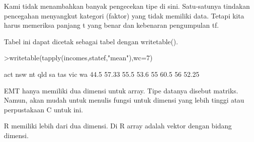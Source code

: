 \documentclass[a4paper,10pt]{article}
\begin{document}
\begin{eulernotebook}
\begin{eulercomment}
\begin{eulercomment}
\begin{eulercomment}
Kami tidak menambahkan banyak pengecekan tipe di sini. Satu-satunya
tindakan pencegahan menyangkut kategori (faktor) yang tidak memiliki
data. Tetapi kita harus memeriksa panjang t yang benar dan kebenaran
pengumpulan tf.

Tabel ini dapat dicetak sebagai tabel dengan writetable().
\end{eulercomment}
\begin{eulerprompt}
>writetable(tapply(incomes,statef,"mean"),wc=7)
\end{eulerprompt}
\begin{euleroutput}
      act    nsw     nt    qld     sa    tas    vic     wa
     44.5  57.33   55.5   53.6     55   60.5     56  52.25
\end{euleroutput}
\begin{eulercomment}
EMT hanya memiliki dua dimensi untuk array. Tipe datanya disebut
matriks. Namun, akan mudah untuk menulis fungsi untuk dimensi yang
lebih tinggi atau perpustakaan C untuk ini.

R memiliki lebih dari dua dimensi. Di R array adalah vektor dengan
bidang dimensi.


\end{eulercomment}
\end{eulercomment}
\end{eulercomment}
\end{eulernotebook}
\end{document}
